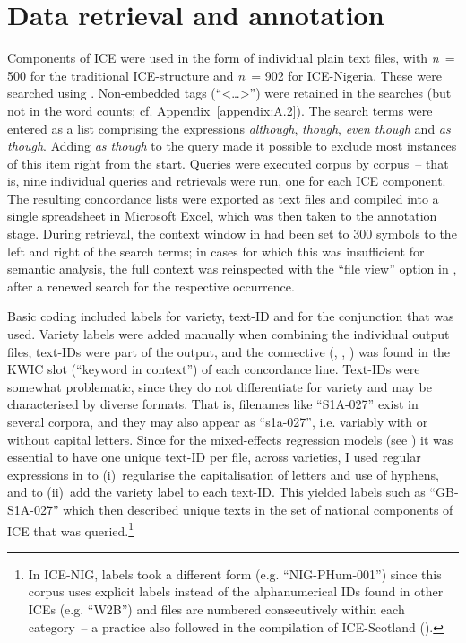 \section{\label{bkm:Ref466296377}Data retrieval and annotation}\label{sec:6.2}


Components of ICE were used in the form of individual plain text files, with \textit{n~}= 500 for the traditional ICE-structure and \textit{n~}= 902 for ICE-Nigeria. These were searched using  \citep{Anthony2018}. Non-embedded tags (“<…>”) were retained in the searches (but not in the word counts; cf. Appendix~\ref{appendix:A.2}). The search terms were entered as a list comprising the expressions \textit{although}, \textit{though}, \textit{even though} and \textit{as though}. Adding \textit{as though} to the query made it possible to exclude most instances of this item right from the start. Queries were executed corpus by corpus~– that is, nine individual queries and retrievals were run, one for each ICE component. The resulting concordance lists were exported as text files and compiled into a single spreadsheet in Microsoft Excel, which was then taken to the annotation stage. During retrieval, the context window in  had been set to 300 symbols to the left and right of the search terms; in cases for which this was insufficient for semantic analysis, the full context was reinspected with the “file view” option in , after a renewed search for the respective occurrence.

\begin{sloppypar}
Basic coding included labels for variety, text-ID and for the conjunction that was used. Variety labels were added manually when combining the individual output files, text-IDs were part of the output, and the connective (, , ) was found in the KWIC slot (“keyword in context”) of each concordance line. Text-IDs were somewhat problematic, since they do not differentiate for variety and may be characterised by diverse formats. That is, filenames like “S1A-027” exist in several corpora, and they may also appear as “s1a-027”, i.e. variably with or without capital letters. Since for the mixed-effects regression models (see ) it was essential to have one unique text-ID per file, across varieties, I used regular expressions in  to
(i)~regularise the capitalisation of letters and use of hyphens, and to
(ii)~add the variety label to each text-ID. This yielded labels such as “GB-S1A-027” which then described unique texts in the set of national components of ICE that was queried.\footnote{In ICE-NIG, labels took a different form (e.g. “NIG-PHum-001”) since this corpus uses explicit  labels instead of the alphanumerical IDs found in other ICEs (e.g. “W2B”) and files are numbered consecutively within each  category~– a practice also followed in the compilation of ICE-Scotland (\citealt{SchützlerGutFuchs2017}).}
\end{sloppypar}

